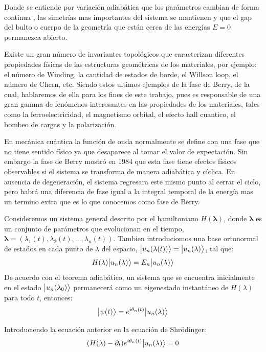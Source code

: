 Donde se entiende por variación adiabática que los parámetros cambian de forma continua , las simetrías mas importantes del sistema se mantienen y que el gap del bulto o cuerpo de la geometría que están cerca de las energías $E=0$ permanezca abierto.

Existe un gran número de invariantes topológicos que caracterizan diferentes propiedades físicas de las estructuras geométricas de los materiales, por ejemplo: el número de Winding, la cantidad de estados de borde, el Willson loop, el número de Chern, etc. Siendo estos ultimos ejemplos de la fase de Berry, de la cual, hablaremos de ella para los fines de este trabajo, pues es responsable de una gran gamma de fenómenos interesantes en las propiedades de los materiales, tales como la ferroelectricidad, el magnetismo orbital, el efecto hall cuantico, el bombeo de cargas y la polarización.

En mecánica cuántica la función de onda normalmente se define con una fase que no tiene sentido físico ya que desaparece al tomar el valor de expectación. Sin embargo la fase de Berry mostró en 1984 que esta fase tiene efectos físicos observables si el sistema se transforma de manera adiabática y cíclica. En ausencia de degeneración, el sistema regresara este mismo punto al cerrar el ciclo, pero habrá una diferencia de fase igual a la integral temporal de la energía mas un termino extra que es lo que conocemos como fase de Berry.

Consideremos un sistema general descrito por el hamiltoniano $H(\mathbf{\lambda})$, donde $\mathbf{\lambda}$ es un conjunto de parámetros que evolucionan en el tiempo, $\mathbf{\lambda} = \left( \lambda_1(t), \lambda_2(t),\dots, \lambda_n(t)\right)$. Tambien introduciomos una base ortonormal de estados en cada punto de $\lambda$ del espacio, $\big |{u_n(\lambda(t))}\big \rangle = \big |{u_n(\lambda)}\big \rangle$, tal que:
\begin{equation}
    H(\lambda) \big |{u_n(\lambda)}\big \rangle =  E_n\big |{u_n(\lambda)}\big \rangle
\end{equation}
De acuerdo con el teorema adiabático, un sistema que se encuentra inicialmente en el estado $\big |{u_n(\lambda_0)}\big \rangle$ permanecerá como un eigenestado instantáneo de $H(\lambda)$ para todo $t$, entonces:
\begin{align}
    \big |{\psi(t)}\big \rangle =  e^{i\theta_n(t)}\big |{u_n(\lambda)}\big \rangle
\end{align}

Introduciendo la ecuación anterior en la ecuación de Shrödinger:
\begin{align}
    (H(\lambda) - \partial_t) e^{i\theta_n(t)}\big |{u_n(\lambda)}\big \rangle =  0
\end{align}

